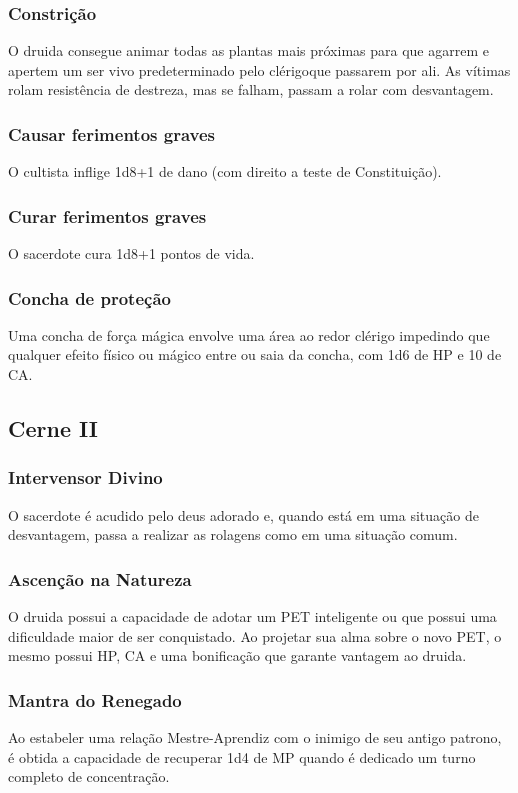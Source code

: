\documentclass[10pt,twoside,twocolumn]{book}
\begin{document}
\subsubsection*{Constrição}
O druida consegue animar todas as plantas mais próximas para que agarrem e apertem um ser vivo predeterminado pelo clérigoque passarem por
ali. As vítimas rolam resistência de destreza, mas se falham, passam a rolar com desvantagem.
\subsubsection*{Causar ferimentos graves}
O cultista inflige 1d8+1 de dano (com direito a teste de Constituição).
\subsubsection*{Curar ferimentos graves}
O sacerdote cura 1d8+1 pontos de vida.
\subsubsection*{Concha de proteção}
Uma concha de força mágica envolve uma área ao redor clérigo impedindo que qualquer efeito físico ou mágico entre ou saia da concha, com 1d6 de HP e 10 de CA.

\subsection*{Cerne II}
\subsubsection*{Intervensor Divino}
O sacerdote é acudido pelo deus adorado e, quando está em uma situação de desvantagem, passa a realizar as rolagens como em uma situação comum.
\subsubsection*{Ascenção na Natureza}
O druida possui a capacidade de adotar um PET inteligente ou que possui uma dificuldade maior de ser conquistado. Ao projetar sua alma sobre o novo PET, o mesmo possui HP, CA e uma bonificação que garante vantagem ao druida.
\subsubsection*{Mantra do Renegado}
Ao estabeler uma relação Mestre-Aprendiz com o inimigo de seu antigo patrono, é obtida a capacidade de recuperar 1d4 de MP quando é dedicado um turno completo de concentração.
\end{document}
